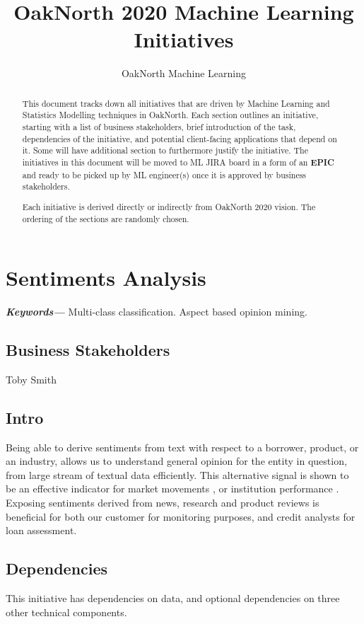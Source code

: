 \documentclass[]{article}
\title{OakNorth 2020 Machine Learning Initiatives}
\author{OakNorth Machine Learning}
\providecommand{\keywords}[1]{\textbf{\textit{Keywords---}} #1}
\begin{document}
\maketitle
\begin{abstract}
    This document tracks down all initiatives that are driven by Machine 
    Learning and Statistics Modelling techniques in OakNorth. Each section 
    outlines an initiative, starting with a list of business stakeholders, 
    brief introduction of the task, dependencies of the initiative, and 
    potential client-facing applications that depend on it. Some will have 
    additional section to furthermore justify the initiative. The initiatives 
    in this document will be moved to ML JIRA board in a form of an 
    \textbf{EPIC} and 
    ready to be picked up by ML engineer(s) once it is approved by business 
    stakeholders.
    
    Each initiative is derived directly or indirectly from OakNorth 2020 
    vision\cite{oaknorth2020vision}. The ordering of the sections are     
    randomly chosen.
\end{abstract}
\section{Sentiments Analysis}

\keywords{Multi-class classification. Aspect based opinion mining.}

\subsection{Business Stakeholders}
Toby Smith

\subsection{Intro}
Being able to derive sentiments from text with respect to a borrower, 
product, or an industry, allows us to understand general opinion for the 
entity in question, from large stream of textual data efficiently. 
This alternative signal is shown to be an effective indicator for 
market movements \cite{bloomberg.com, bloomberg_quants}, or institution 
performance \cite{kasper2011sentiment, loughran2016textual}. Exposing 
sentiments derived from news, research and product reviews is beneficial 
for both our customer for monitoring purposes, and credit analysts for loan 
assessment. 


\subsection{Dependencies}
This initiative has dependencies on data, and optional dependencies on 
three other technical components. 
\end{document}
